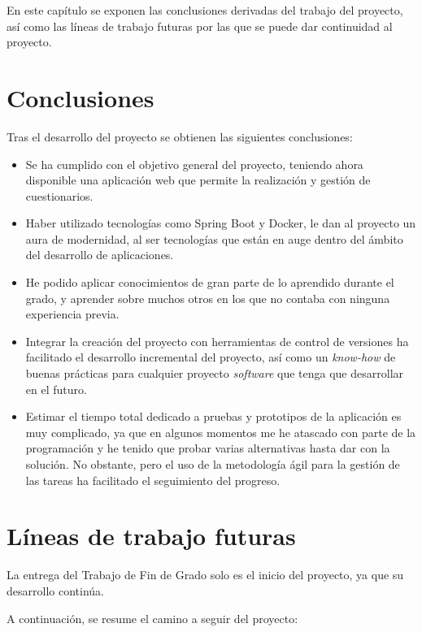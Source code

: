 
En este capítulo se exponen las conclusiones derivadas del trabajo del proyecto, así como las líneas de trabajo futuras por las que se puede dar continuidad al proyecto.

\section{Conclusiones}

Tras el desarrollo del proyecto se obtienen las siguientes conclusiones:

\begin{itemize}
	\item Se ha cumplido con el objetivo general del proyecto, teniendo ahora disponible una aplicación web que permite la realización y gestión de cuestionarios.
	\item Haber utilizado tecnologías como Spring Boot y Docker, le dan al proyecto un aura de modernidad, al ser tecnologías que están en auge dentro del ámbito del desarrollo de aplicaciones.
	\item He podido aplicar conocimientos de gran parte de lo aprendido durante el grado, y aprender sobre muchos otros en los que no contaba con ninguna experiencia previa.
	\item Integrar la creación del proyecto con herramientas de control de versiones ha facilitado el desarrollo incremental del proyecto, así como un \textit{know-how} de buenas prácticas para cualquier proyecto \textit{software} que tenga que desarrollar en el futuro.
	\item Estimar el tiempo total dedicado a pruebas y prototipos de la aplicación es muy complicado, ya que en algunos momentos me he atascado con parte de la programación y he tenido que probar varias alternativas hasta dar con la solución. No obstante, pero el uso de la metodología ágil para la gestión de las tareas ha facilitado el seguimiento del progreso.
\end{itemize}

\section{Líneas de trabajo futuras}

La entrega del Trabajo de Fin de Grado solo es el inicio del proyecto, ya que su desarrollo continúa.

A continuación, se resume el camino a seguir del proyecto:

